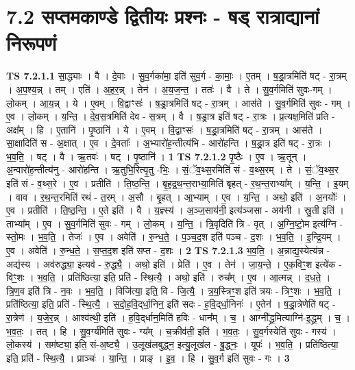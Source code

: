 \documentclass[17pt]{extarticle}
\begin{document}
\section*{ 7.2      सप्तमकाण्डे द्वितीयः प्रश्नः - षड् रात्राद्यानां निरूपणं }
                                \textbf{ TS 7.2.1.1} \newline
                  सा॒द्ध्याः । वै । दे॒वाः । सु॒व॒र्गका॑मा॒ इति॑ सुव॒र्ग - का॒माः॒ । ए॒तम् । ष॒ड्रा॒त्रमिति॑ षट् - रा॒त्रम् । अ॒प॒श्य॒न्न् । तम् । एति॑ । अ॒ह॒र॒न्न् । तेन॑ । अ॒य॒ज॒न्त॒ । ततः॑ । वै । ते । सु॒व॒र्गमिति॑ सुवः-गम् । लो॒कम् । आ॒य॒न्न् । ये । ए॒वम् । वि॒द्वाꣳसः॑ । ष॒ड्रा॒त्रमिति॑ षट् - रा॒त्रम् । आस॑ते । सु॒व॒र्गमिति॑ सुवः - गम् । ए॒व । लो॒कम् । य॒न्ति॒ । दे॒व॒स॒त्रमिति॑ देव - स॒त्रम् । वै । ष॒ड्रा॒त्र इति॑ षट् - रा॒त्रः । प्र॒त्यक्ष॒मिति॑ प्रति - अक्ष᳚म् । हि । ए॒तानि॑ । पृ॒ष्ठानि॑ । ये । ए॒वम् । वि॒द्वाꣳसः॑ । ष॒ड्रा॒त्रमिति॑ षट् - रा॒त्रम् । आस॑ते । सा॒क्षादिति॑ स - अ॒क्षात् । ए॒व । दे॒वताः᳚ । अ॒भ्यारो॑ह॒न्तीत्य॑भि - आरो॑हन्ति । ष॒ड्रा॒त्र इति॑ षट् - रा॒त्रः । भ॒व॒ति॒ । षट् । वै । ऋ॒तवः॑ । षट् । पृ॒ष्ठानि॑ । \textbf{  1} \newline
                  \newline
                                \textbf{ TS 7.2.1.2} \newline
                  पृ॒ष्ठैः । ए॒व । ऋ॒तून् । अ॒न्वारो॑ह॒न्तीत्य॑नु - आरो॑हन्ति । ऋ॒तुभि॒रित्यृ॒तु -भिः॒ । सं॒ॅव॒थ्स॒रमिति॑ सं - व॒थ्स॒रम् । ते । सं॒ॅव॒थ्स॒र इति॑ सं - व॒थ्स॒रे । ए॒व । प्रतीति॑ । ति॒ष्ठ॒न्ति॒ । बृ॒ह॒द्र॒थ॒न्त॒राभ्या॒मिति॑ बृहत् - र॒थ॒न्त॒राभ्या᳚म् । य॒न्ति॒ । इ॒यम् । वाव । र॒थ॒न्त॒रमिति॑ रथं - त॒रम् । अ॒सौ । बृ॒हत् । आ॒भ्याम् । ए॒व । य॒न्ति॒ । अथो॒ इति॑ । अ॒नयोः᳚ । ए॒व । प्रतीति॑ । ति॒ष्ठ॒न्ति॒ । ए॒ते इति॑ । वै । य॒ज्ञ्स्य॑ । अ॒ञ्ज॒साय॑नी॒ इत्य॑ञ्जसा - अय॑नी । स्रु॒ती इति॑ । ताभ्या᳚म् । ए॒व । सु॒व॒र्गमिति॑ सुवः - गम् । लो॒कम् । य॒न्ति॒ । त्रि॒वृदिति॑ त्रि - वृत् । अ॒ग्नि॒ष्टो॒म इत्य॑ग्नि - स्तो॒मः । भ॒व॒ति॒ । तेजः॑ । ए॒व । अवेति॑ । रु॒न्ध॒ते॒ । प॒ञ्च॒द॒श इति॑ पञ्च - द॒शः । भ॒व॒ति॒ । इ॒न्द्रि॒यम् । ए॒व । अवेति॑ । रु॒न्ध॒ते॒ । स॒प्त॒द॒श इति॑ सप्त - द॒शः । \textbf{  2} \newline
                  \newline
                                \textbf{ TS 7.2.1.3} \newline
                  भ॒व॒ति॒ । अ॒न्नाद्य॒स्येत्य॑न्न - अद्य॑स्य । अव॑रुद्ध्या॒ इत्यव॑ - रु॒द्ध्यै॒ । अथो॒ इति॑ । प्रेति॑ । ए॒व । तेन॑ । जा॒य॒न्ते॒ । ए॒क॒विꣳ॒॒श इत्ये॑क - विꣳ॒॒शः । भ॒व॒ति॒ । प्रति॑ष्ठित्या॒ इति॒ प्रति॑ - स्थि॒त्यै॒ । अथो॒ इति॑ । रुच᳚म् । ए॒व । आ॒त्मन्न् । द॒ध॒ते॒ । त्रि॒ण॒व इति॑ त्रि - न॒वः । भ॒व॒ति॒ । विजि॑त्या॒ इति॒ वि - जि॒त्यै॒ । त्र॒य॒स्त्रिꣳ॒॒श इति॑ त्रयः - त्रिꣳ॒॒शः । भ॒व॒ति॒ । प्रति॑ष्ठित्या॒ इति॒ प्रति॑ - स्थि॒त्यै॒ । स॒दो॒ह॒वि॒द्‌र्धा॒निन॒ इति॑ सदः - ह॒वि॒द्‌र्धा॒निनः॑ । ए॒तेन॑ । ष॒ड्रा॒त्रेणेति॑ षट् - रा॒त्रेण॑ । य॒जे॒र॒न्न् । आश्व॑त्थी॒ इति॑ । ह॒वि॒द्‌र्धान॒मिति॑ हविः - धान᳚म् । च॒ । आग्नी᳚द्ध्र॒मित्याग्नि॑-इ॒द्ध्र॒म् । च॒ । भ॒व॒तः॒ । तत् । हि । सु॒व॒र्ग्य॑मिति॑ सुवः - ग्य᳚म् । च॒क्रीव॑ती॒ इति॑ । भ॒व॒तः॒ । सु॒व॒र्गस्येति॑ सुवः - गस्य॑ । लो॒कस्य॑ । सम॑ष्ट्या॒ इति॒ सं-अ॒ष्ट्यै॒ । उ॒लूख॑लबुद्ध्न॒ इत्यु॒लूख॑ल - बु॒द्ध्नः॒ । यूपः॑ । भ॒व॒ति॒ । प्रति॑ष्ठित्या॒ इति॒ प्रति॑ - स्थि॒त्यै॒ । प्राञ्चः॑ । या॒न्ति॒ । प्राङ् । इ॒व॒ । हि । सु॒व॒र्ग इति॑ सुवः - गः । \textbf{  3} \newline
\end{document}
